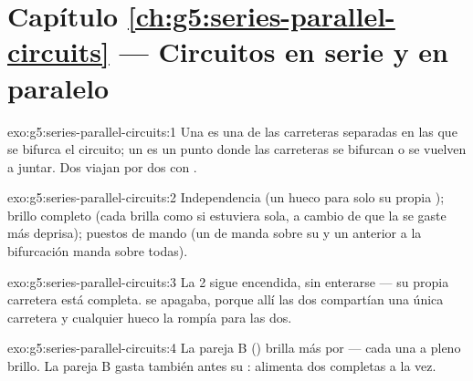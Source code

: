 \section*{Capítulo \ref{ch:g5:series-parallel-circuits} --- Circuitos en serie y en paralelo}

\begin{solution}{exo:g5:series-parallel-circuits:1}
Una  es una de las carreteras separadas en las que se
bifurca el circuito; un  es un punto donde las carreteras se
bifurcan o se vuelven a juntar. Dos   viajan
por dos  con .
\end{solution}

\begin{solution}{exo:g5:series-parallel-circuits:2}
Independencia (un hueco para solo su propia ); brillo completo
(cada  brilla como si estuviera sola, a cambio de que la
 se gaste más deprisa); puestos de mando (un  de
 manda sobre su  y un  anterior a la
bifurcación manda sobre todas).
\end{solution}

\begin{solution}{exo:g5:series-parallel-circuits:3}
La  2 sigue encendida, sin enterarse --- su propia carretera
está completa.  se apagaba, porque allí las dos
 compartían una única carretera y cualquier hueco la
rompía para las dos.
\end{solution}

\begin{solution}{exo:g5:series-parallel-circuits:4}
La pareja B () brilla más por  --- cada una a
pleno brillo. La pareja B gasta también antes su : alimenta dos
 completas a la vez.
\end{solution}


